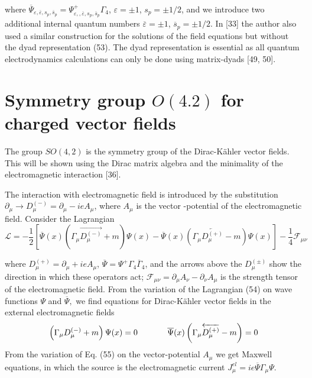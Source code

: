 \documentclass[a4paper,12pt]{article}
\begin{document}
where $\overline{\Psi }_{\varepsilon ,\overline{\varepsilon
},s_p,\overline{s }_p}=\Psi _{\varepsilon ,,\overline{\varepsilon
},s_p,\overline{s} _p}^{+}\Gamma _4$, $\varepsilon =\pm 1$,
$s_p=\pm 1/2$, and we introduce two additional internal quantum
numbers $\overline{\varepsilon }=\pm 1$, $ \overline{s}_p=\pm
1/2$. In [33] the author also used a similar construction for the
solutions of the field equations but without the dyad
representation (53). The dyad representation is essential as all
quantum electrodynamics calculations can only be done using
matrix-dyads [49, 50].

\section{Symmetry group $O(4.2)$ for charged vector fields}

The group $SO(4,2)$ is the symmetry group of the Dirac-K\"ahler vector
fields. This will be shown using the Dirac matrix algebra and the minimality
of the electromagnetic interaction [36].

The interaction with electromagnetic field is introduced by the
substitution $\partial _\mu \rightarrow D_\mu ^{(-)}=\partial _\mu
-ieA_\mu $, where $ A_\mu $ is the vector -potential of the
electromagnetic field. Consider the Lagrangian
\begin{equation}
\mathcal{L}=-\frac 12\left[ \overline{\Psi }(x)\left( \Gamma _\mu
\overrightarrow{D_\mu ^{(-)}}+m\right) \Psi (x)-\overline{\Psi
}(x)\left( \Gamma _\mu \overleftarrow{D_\mu ^{(+)}}-m\right) \Psi
(x)\right] -\frac 14 \mathcal{F}_{\mu \nu }  \label{54}
\end{equation}

where $D_\mu ^{(+)}=\partial _\mu +ieA_\mu $, $\overline{\Psi }=\Psi
^{+}\Gamma _4\overline{\Gamma }_4$, and the arrows above the $D_\mu ^{(\pm
)} $ show the direction in which these operators act; $\mathcal{F}_{\mu \nu
}=\partial _\mu A_\nu -\partial _\nu A_\mu $ is the strength tensor of the
electromagnetic field. From the variation of the Lagrangian (54) on wave
functions $\Psi $ and $\overline{\Psi },$ we find equations for
Dirac-K\"ahler vector fields in the external electromagnetic fields
\begin{equation}
\left( \Gamma _\mu D_\mu ^{(-)}+m\right) \Psi
(x)=0\hspace{0.5in}\overline{ \Psi }(x)\left( \Gamma _\mu
\overleftarrow{D_\mu ^{(+)}}-m\right) =0 \label{55}
\end{equation}
From the variation of Eq. (55) on the vector-potential $A_\mu $ we get
Maxwell equations, in which the source is the electromagnetic current $J_\mu
^{el}=ie\overline{\Psi }\Gamma _\mu \Psi $.
\end{document}
